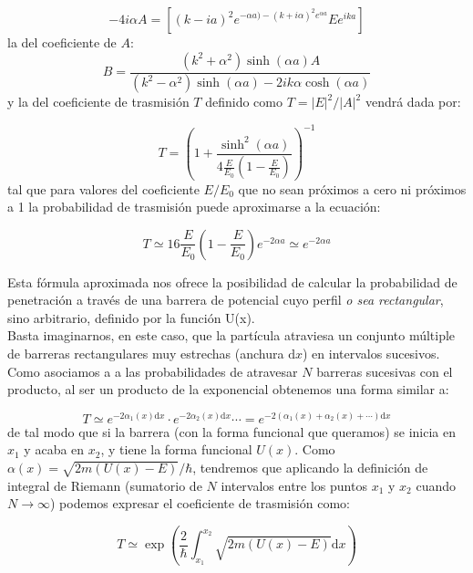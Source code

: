 \documentclass[12pt]{article}
\newcommand{\parentesis}[1]{\left( #1  \right)}
\newcommand{\ccorchetes}[1]{\left[ #1  \right]}
\newcommand{\D}{\mathrm{d}}
\begin{document}
\begin{equation}
-4 i \alpha A = \ccorchetes{(k-ia)^2 e^{-\alpha a) - (k+i \alpha)^2 e^{\alpha a}}E e^{ika}}
\end{equation}
la del coeficiente de $A$:
\begin{equation}
B = \dfrac{(k^2 + \alpha^2) \sinh (\alpha a) A}{(k^2 - \alpha^2) \sinh (\alpha a) - 2 i k \alpha \cosh (\alpha a)}
\end{equation}
y la del coeficiente de trasmisión $T$ definido como $T=|E|^2 / |A|^2$ vendrá dada por:

\begin{equation}
T = \parentesis{1+ \dfrac{\sinh^2 (\alpha a)}{4 \frac{E}{E_0} \parentesis{1-\frac{E}{E_0}}}}^{-1}
\end{equation}
tal que para valores del coeficiente $E/E_0$ que no sean próximos a cero ni próximos a 1 la probabilidad de trasmisión puede aproximarse a la ecuación:

\begin{equation}
T \simeq 16 \dfrac{E}{E_0} \parentesis{1-\dfrac{E}{E_0}} e^{-2\alpha a} \simeq e^{-2 \alpha a}
\end{equation}

Esta fórmula aproximada nos ofrece la posibilidad de calcular la probabilidad de penetración a través de una barrera de potencial cuyo perfil \textit{o sea rectangular}, sino arbitrario, definido por la función U(x). \\

Basta imaginarnos, en este caso, que la partícula atraviesa un conjunto múltiple de barreras rectangulares muy estrechas (anchura $\D x$) en intervalos sucesivos. Como asociamos a a las probabilidades de atravesar $N$ barreras sucesivas con el producto, al ser un producto de la exponencial obtenemos una forma similar a:

\begin{equation}
T \simeq e^{-2 \alpha_1 (x) \D x } \cdot  e^{-2 \alpha_2 (x) \D x}  \cdots = e^{-2 (\alpha_1 (x) + \alpha_2(x) + \cdots) \D x}
\end{equation}
de tal modo que si la barrera (con la forma funcional que queramos) se inicia en $x_1$ y acaba en $x_2$, y tiene la forma funcional $U(x)$. Como $\alpha(x) = \sqrt{2m (U(x)-E)}/\hbar$, tendremos que aplicando la definición de integral de Riemann (sumatorio de $N$ intervalos entre los puntos $x_1$ y $x_2$ cuando $N \rightarrow \infty$) podemos expresar el coeficiente de trasmisión como: 

\begin{equation}
T \simeq \exp \parentesis{\frac{2}{\hbar} \int_{x_1}^{x_2}  \sqrt{2m (U(x) -E)} \D x}
\end{equation}
\end{document}
